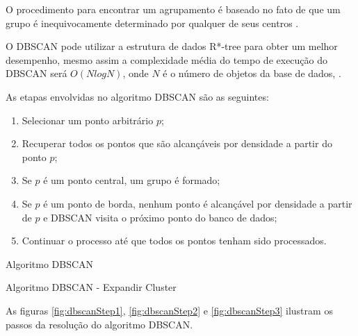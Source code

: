 O procedimento para encontrar um agrupamento é baseado no fato de que um grupo é inequivocamente determinado por qualquer de seus centros \cite{ESTER1998}. 

O \acrshort{DBSCAN} pode utilizar a estrutura de dados R*-tree para obter um melhor desempenho, mesmo assim  a complexidade média do tempo de execução do \acrshort{DBSCAN} será ${O (N logN)}$, onde ${N}$ é o número de objetos da base de dados, \cite{Sheikholeslami1998}.

As etapas envolvidas no algoritmo DBSCAN são as seguintes:

\begin{enumerate}
	\item Selecionar um ponto arbitrário ${p}$;
	\item Recuperar todos os pontos que são alcançáveis por densidade a partir do ponto ${p}$;
	\item Se ${p}$ é um ponto central, um grupo é formado;
	\item Se ${p}$ é um ponto de borda, nenhum ponto é alcançável por densidade a partir de ${p}$ e \acrshort{DBSCAN} visita o próximo ponto do banco de dados;
	\item Continuar o processo até que todos os pontos tenham sido processados.
\end{enumerate}


\begin{algorithm}[!ht]
	\SetSpacedAlgorithm
	\caption{\label{alg:algoritmo_dbscan}Algoritmo \acrshort{DBSCAN}}
\end{algorithm}
\begin{algorithm}[!ht]
	\SetSpacedAlgorithm
	\caption{\label{alg:algoritmo_dbscan_exp}Algoritmo \acrshort{DBSCAN} - Expandir Cluster}
\end{algorithm}
\pagebreak
As figuras \ref{fig:dbscanStep1}, \ref{fig:dbscanStep2} e \ref{fig:dbscanStep3} ilustram os passos da resolução do algoritmo \acrshort{DBSCAN}.

